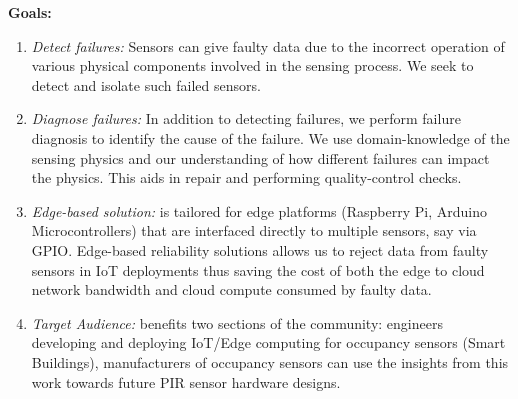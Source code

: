 \noindent \textbf{Goals:}
\begin{enumerate}[leftmargin=*]
	\itemsep0pt
	
	\item {\itshape Detect failures:} Sensors can give faulty data due to the incorrect operation of various physical components involved in the sensing process. We seek to detect and isolate such failed sensors. %
	
	\item {\itshape Diagnose failures:} In addition to detecting failures, we perform failure diagnosis to identify the cause of the failure. We use domain-knowledge of the sensing physics and our understanding of how different failures can impact the physics. This aids in repair and performing quality-control checks.
	
	\item {\itshape Edge-based solution:} \sol is tailored for edge platforms (Raspberry Pi, Arduino Microcontrollers) that are interfaced directly to multiple sensors, say via GPIO. %
	Edge-based reliability solutions allows us to reject data from faulty sensors in IoT deployments thus saving the cost of both \ca the edge to cloud network bandwidth and \cb cloud compute consumed by faulty data.
	
	\item {\itshape Target Audience:} \sol benefits two sections of the community: \ca engineers developing and deploying IoT/Edge computing for occupancy sensors (\eg Smart Buildings), \cb manufacturers of occupancy sensors can use the insights from this work towards future PIR sensor hardware designs.
	
\end{enumerate}


